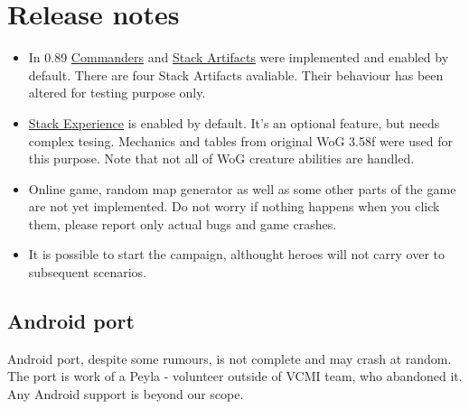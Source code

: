 \documentclass[a4size,final]{article}
\begin{document}
\section{Release notes}
\begin{itemize}
\item In 0.89 \hyperref[Commanders]{Commanders} and \hyperref[Stack_Artifacts]{Stack Artifacts} were implemented and enabled by default. There are four Stack Artifacts avaliable. Their behaviour has been altered for testing purpose only.
\item \hyperref[Stack_Experience]{Stack Experience} is enabled by default. It's an optional feature, but needs complex tesing. Mechanics and tables from original WoG 3.58f were used for this purpose. Note that not all of WoG creature abilities are handled.
\item Online game, random map generator as well as some other parts of the game are not yet implemented. Do not worry if nothing happens when you click them, please report only actual bugs and game crashes.
\item It is possible to start the campaign, althought heroes will not carry over to subsequent scenarios.
\end{itemize}
\subsection{Android port}
Android port, despite some rumours, is not complete and may crash at random. The port is work of a Peyla - volunteer outside of VCMI team, who abandoned it. Any Android support is beyond our scope.
\label{Feedback}
\end{document}
